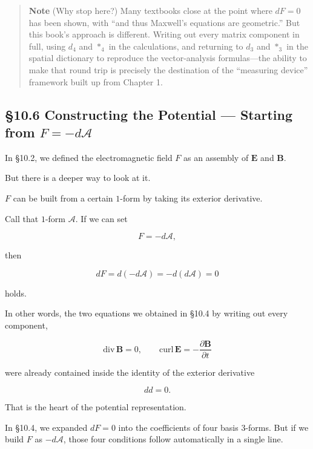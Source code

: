 \documentclass[a4paper,12pt,openany]{book}
\begin{document}
\begin{quote}
\textbf{Note} (Why stop here?) Many textbooks close at the point where
\(dF=0\) has been shown, with ``and thus Maxwell's equations are
geometric.'' But this book's approach is different. Writing out every
matrix component in full, using \(d_4\) and \(\ast_4\) in the
calculations, and returning to \(d_3\) and \(\ast_3\) in the spatial
dictionary to reproduce the vector-analysis formulas—the ability to
make that round trip is precisely the destination of the ``measuring
device'' framework built up from Chapter 1.
\end{quote}

\par\vspace{0.35em}\par

\hypertarget{constructing-the-potential-starting-from-f-dmathcala}{%
\subsection{\texorpdfstring{§10.6 Constructing the Potential —
Starting from
\(F=-d\mathcal{A}\)}{§10.6 Constructing the Potential — Starting from F=-d\textbackslash mathcal\{A\}}}\label{constructing-the-potential-starting-from-f-dmathcala}}

In §10.2, we defined the electromagnetic field \(F\) as an assembly of
\(\mathbf{E}\) and \(\mathbf{B}\).

But there is a deeper way to look at it.

\(F\) can be built from a certain \(1\)-form by taking its exterior
derivative.

Call that \(1\)-form \(\mathcal{A}\). If we can set

\[
F=-d\mathcal{A},
\]

then

\[
dF
=
d(-d\mathcal{A})
=
-d(d\mathcal{A})
=
0
\]

holds.

In other words, the two equations we obtained in §10.4 by writing out
every component,

\[
\mathrm{div}\,\mathbf{B}=0,
\qquad
\mathrm{curl}\,\mathbf{E}
=
-\frac{\partial\mathbf{B}}{\partial t}
\]

were already contained inside the identity of the exterior derivative

\[
dd=0.
\]

That is the heart of the potential representation.

In §10.4, we expanded \(dF=0\) into the coefficients of four basis
\(3\)-forms. But if we build \(F\) as \(-d\mathcal{A}\), those four
conditions follow automatically in a single line.
\end{document}
